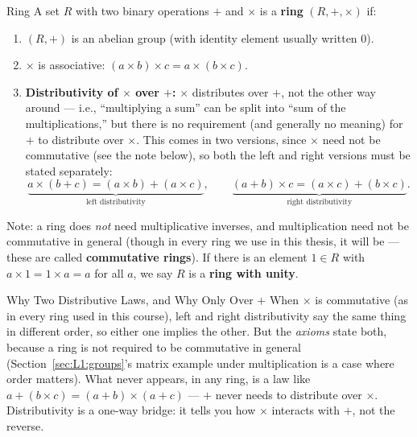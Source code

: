 \begin{defbox}{Ring}
A set $R$ with two binary operations $+$ and $\times$ is a \textbf{ring} $(R, +, \times)$ if:
\begin{enumerate}[leftmargin=*, label=(R\arabic*)]
  \item $(R, +)$ is an abelian group (with identity element usually written $0$).
  \item $\times$ is associative: $(a \times b) \times c = a \times (b \times c)$.
  \item \textbf{Distributivity of $\times$ over $+$:} $\times$ distributes over $+$, not the other way around --- i.e., ``multiplying a sum'' can be split into ``sum of the multiplications,'' but there is no requirement (and generally no meaning) for $+$ to distribute over $\times$. This comes in two versions, since $\times$ need not be commutative (see the note below), so both the left and right versions must be stated separately:
  $$
  \underbrace{a \times (b + c) = (a \times b) + (a \times c)}_{\text{left distributivity}}, \qquad \underbrace{(a+b)\times c = (a \times c) + (b \times c)}_{\text{right distributivity}}.
  $$
\end{enumerate}
Note: a ring does \emph{not} need multiplicative inverses, and multiplication need not be commutative in general (though in every ring we use in this thesis, it will be --- these are called \textbf{commutative rings}). If there is an element $1 \in R$ with $a \times 1 = 1 \times a = a$ for all $a$, we say $R$ is a \textbf{ring with unity}.

\begin{rmkbox}{Why Two Distributive Laws, and Why Only Over $+$}
When $\times$ is commutative (as in every ring used in this course), left and right distributivity say the same thing in different order, so either one implies the other. But the \emph{axioms} state both, because a ring is not required to be commutative in general (Section~\ref{sec:L1:groups}'s matrix example under multiplication is a case where order matters). What never appears, in any ring, is a law like $a + (b\times c) = (a+b)\times(a+c)$ --- $+$ never needs to distribute over $\times$. Distributivity is a one-way bridge: it tells you how $\times$ interacts with $+$, not the reverse.
\end{rmkbox}
\end{defbox}

